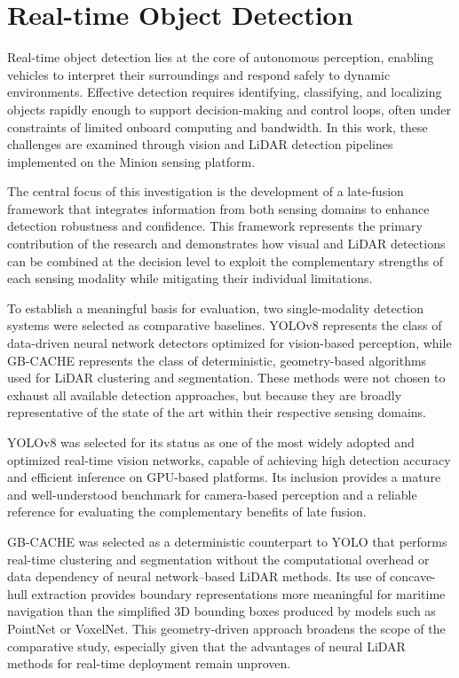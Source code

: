 \documentclass{erauthesis}
\begin{document}
\chapter{Real-time Object Detection} \label{realtime_object_detection}


Real-time object detection lies at the core of autonomous perception, enabling vehicles to interpret their surroundings and respond safely to dynamic environments.
Effective detection requires identifying, classifying, and localizing objects rapidly enough to support decision-making and control loops, often under constraints of limited onboard computing and bandwidth.
In this work, these challenges are examined through vision and LiDAR detection pipelines implemented on the Minion sensing platform.

The central focus of this investigation is the development of a late-fusion framework that integrates information from both sensing domains to enhance detection robustness and confidence.
This framework represents the primary contribution of the research and demonstrates how visual and LiDAR detections can be combined at the decision level to exploit the complementary strengths of each sensing modality while mitigating their individual limitations.

To establish a meaningful basis for evaluation, two single-modality detection systems were selected as comparative baselines.
YOLOv8 represents the class of data-driven neural network detectors optimized for vision-based perception, while GB-CACHE represents the class of deterministic, geometry-based algorithms used for LiDAR clustering and segmentation.
These methods were not chosen to exhaust all available detection approaches, but because they are broadly representative of the state of the art within their respective sensing domains.

YOLOv8 was selected for its status as one of the most widely adopted and optimized real-time vision networks, capable of achieving high detection accuracy and efficient inference on GPU-based platforms.
Its inclusion provides a mature and well-understood benchmark for camera-based perception and a reliable reference for evaluating the complementary benefits of late fusion.

GB-CACHE was selected as a deterministic counterpart to YOLO that performs real-time clustering and segmentation without the computational overhead or data dependency of neural network–based LiDAR methods.
Its use of concave-hull extraction provides boundary representations more meaningful for maritime navigation than the simplified 3D bounding boxes produced by models such as PointNet or VoxelNet.
This geometry-driven approach broadens the scope of the comparative study, especially given that the advantages of neural LiDAR methods for real-time deployment remain unproven.
\end{document}

